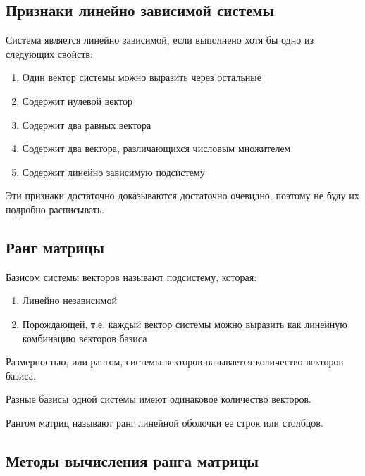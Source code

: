 \documentclass[12pt, a4paper]{article}
\begin{document}
    \subsection{Признаки линейно зависимой системы}
    Система является линейно зависимой, если выполнено хотя бы одно из следующих свойств:
    \begin{enumerate}
        \item Один вектор системы можно выразить через остальные
        \item Содержит нулевой вектор
        \item Содержит два равных вектора
        \item Содержит два вектора, различающихся числовым множителем
        \item Содержит линейно зависимую подсистему
    \end{enumerate}
    \begin{rem}
        Эти признаки достаточно доказываются достаточно очевидно, поэтому не буду их подробно расписывать.
        
    \end{rem}
    \subsection{Ранг матрицы}
    \begin{definition}
        Базисом системы векторов называют подсистему, которая: 
        \begin{enumerate}
            \item Линейно независимой
            \item Порождающей, т.е. каждый вектор системы можно выразить как линейную комбинацию векторов базиса
        \end{enumerate}
    \end{definition}
    \begin{definition}
        Размерностью, или рангом, системы векторов называется количество векторов базиса.
    \end{definition}
    \begin{rem}
        Разные базисы одной системы имеют одинаковое количество векторов.
    \end{rem}
    \begin{definition}
        Рангом матриц называют ранг линейной оболочки ее строк или столбцов.
    \end{definition}
    \subsection{Методы вычисления ранга матрицы}
\end{document}
